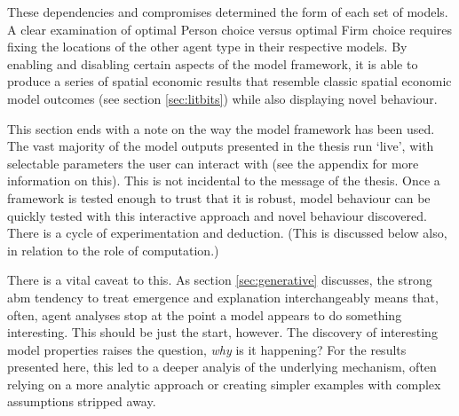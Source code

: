 These dependencies and compromises determined the form of each set of models. A clear examination of optimal Person choice versus optimal Firm choice requires fixing the locations of the other agent type in their respective models. By enabling and disabling certain aspects of the model framework, it is able to produce a series of spatial economic results that resemble classic spatial economic model outcomes (see section \ref{sec:litbits}) while also displaying novel behaviour.


This section ends with a note on the way the model framework has been used. The vast majority of the model outputs presented in the thesis run `live', with selectable parameters the user can interact with (see the appendix for more information on this). This is not incidental to the message of the thesis. Once a framework is tested enough to trust that it is robust, model behaviour can be quickly tested with this interactive approach and novel behaviour discovered. There is a cycle of experimentation and deduction. (This is discussed below also, in relation to the role of computation.)

There is a vital caveat to this. As section \ref{sec:generative} discusses, the strong \gls{abm} tendency to treat emergence and explanation interchangeably means that, often, agent analyses stop at the point a model appears to do something interesting. This should be just the start, however. The discovery of interesting model properties raises the question, \emph{why} is it happening? For the results presented here, this led to a deeper analyis of the underlying mechanism, often relying on a more analytic approach or creating simpler examples with complex assumptions stripped away.

